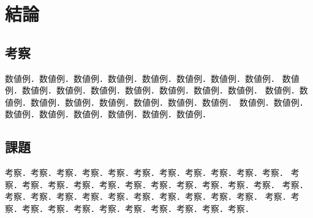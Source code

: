 ﻿%
\chapter{結論}

\section{考察}

数値例．数値例．数値例．数値例．数値例．数値例．数値例．数値例．
数値例．数値例．数値例．数値例．数値例．数値例．数値例．数値例．
数値例．数値例．数値例．数値例．数値例．数値例．数値例．数値例．
数値例．数値例．数値例．数値例．数値例．数値例．数値例．数値例．


\section{課題}

考察．考察．考察．考察．考察．考察．考察．考察．考察．考察．考察．
考察．考察．考察．考察．考察．考察．考察．考察．考察．考察．考察．
考察．考察．考察．考察．考察．考察．考察．考察．考察．考察．考察．
考察．考察．考察．考察．考察．考察．考察．考察．考察．考察．考察．
